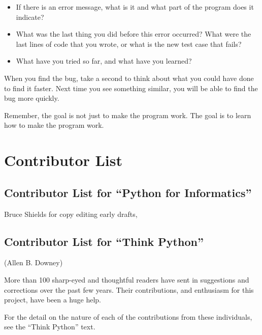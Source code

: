 \documentclass[10pt]{book}
\begin{document}
\begin{itemize}

\item If there is an error message, what is it
and what part of the program does it indicate?

\item What was the last thing you did before this error occurred?
What were the last lines of code that you wrote, or what is
the new test case that fails?

\item What have you tried so far, and what have you learned?

\end{itemize}

When you find the bug, take a second to think about what you
could have done to find it faster.  Next time you see something
similar, you will be able to find the bug more quickly.

Remember, the goal is not just to make the program
work.  The goal is to learn how to make the program work.



\chapter{Contributor List}
\section*{Contributor List for ``Python for Informatics''}

Bruce Shields for copy editing early drafts,

\section*{Contributor List for ``Think Python''}


(Allen B. Downey)

More than 100 sharp-eyed and thoughtful readers have sent in
suggestions and corrections over the past few years.  Their
contributions, and enthusiasm for this project, have been a
huge help.

For the detail on the nature of each of the contributions from
these individuals, see the ``Think Python'' text.
\end{document}
